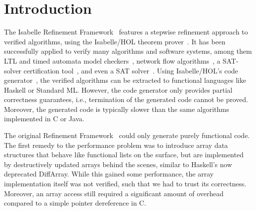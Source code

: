 \documentclass[a4paper,USenglish,cleveref, autoref]{lipics-v2019}
\begin{document}
\section{Introduction}\label{sec:introduction}

% 


The Isabelle Refinement Framework~\cite{LaTu12,La13,La15} features a stepwise refinement approach to verified algorithms, using the Isabelle/HOL theorem prover~\cite{NPW02,NiKl14}.
It has been successfully applied to verify many algorithms and software systems, 
among them LTL and timed automata model checkers~\cite{ELNN13,BrLa18,WiLa18}, network flow algorithms~\cite{LaSe19,LaSe16}, a SAT-solver certification tool~\cite{La17_CADE,La17_SAT}, and even a SAT solver~\cite{FBL18}.
Using Isabelle/HOL's code generator~\cite{HKKN13}, the verified algorithms can be extracted to functional languages like Haskell or Standard ML.
However, the code generator only provides partial correctness guarantees, i.e., termination of the generated code cannot be proved.
Moreover, the generated code is typically slower than the same algorithms implemented in C or Java. 

The original Refinement Framework~\cite{LaTu12,La13} could only generate purely functional code. 
The first remedy to the performance problem was to introduce array data structures that behave like functional 
lists on the surface, but are implemented by destructively updated arrays behind the scenes, similar to Haskell's now deprecated DiffArray.
While this gained some performance, the array implementation itself was not verified, such that we had to trust its correctness. 
Moreover, an array access still required a significant amount of overhead compared to a simple pointer dereference in C.
\end{document}
